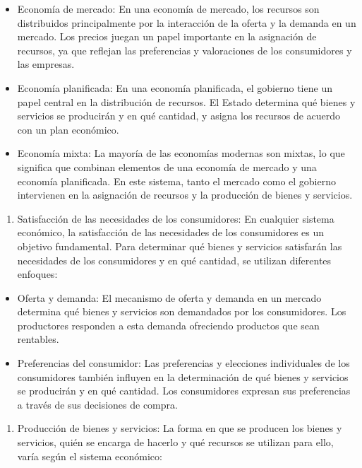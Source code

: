 \documentclass[
  man,
  floatsintext,
  longtable,
  a4paper,
  nolmodern,
  notxfonts,
  notimes,
  colorlinks=true,linkcolor=blue,citecolor=blue,urlcolor=blue]{apa7}
\providecommand{\tightlist}{%
  \setlength{\itemsep}{0pt}\setlength{\parskip}{0pt}}
\begin{document}
\begin{itemize}
\item
  Economía de mercado: En una economía de mercado, los recursos son
  distribuidos principalmente por la interacción de la oferta y la
  demanda en un mercado. Los precios juegan un papel importante en la
  asignación de recursos, ya que reflejan las preferencias y
  valoraciones de los consumidores y las empresas.
\item
  Economía planificada: En una economía planificada, el gobierno tiene
  un papel central en la distribución de recursos. El Estado determina
  qué bienes y servicios se producirán y en qué cantidad, y asigna los
  recursos de acuerdo con un plan económico.
\item
  Economía mixta: La mayoría de las economías modernas son mixtas, lo
  que significa que combinan elementos de una economía de mercado y una
  economía planificada. En este sistema, tanto el mercado como el
  gobierno intervienen en la asignación de recursos y la producción de
  bienes y servicios.
\end{itemize}

\begin{enumerate}
\def\labelenumi{\arabic{enumi}.}
\setcounter{enumi}{1}
\tightlist
\item
  Satisfacción de las necesidades de los consumidores: En cualquier
  sistema económico, la satisfacción de las necesidades de los
  consumidores es un objetivo fundamental. Para determinar qué bienes y
  servicios satisfarán las necesidades de los consumidores y en qué
  cantidad, se utilizan diferentes enfoques:
\end{enumerate}

\begin{itemize}
\item
  Oferta y demanda: El mecanismo de oferta y demanda en un mercado
  determina qué bienes y servicios son demandados por los consumidores.
  Los productores responden a esta demanda ofreciendo productos que sean
  rentables.
\item
  Preferencias del consumidor: Las preferencias y elecciones
  individuales de los consumidores también influyen en la determinación
  de qué bienes y servicios se producirán y en qué cantidad. Los
  consumidores expresan sus preferencias a través de sus decisiones de
  compra.
\end{itemize}

\begin{enumerate}
\def\labelenumi{\arabic{enumi}.}
\setcounter{enumi}{2}
\tightlist
\item
  Producción de bienes y servicios: La forma en que se producen los
  bienes y servicios, quién se encarga de hacerlo y qué recursos se
  utilizan para ello, varía según el sistema económico:
\end{enumerate}
\end{document}
